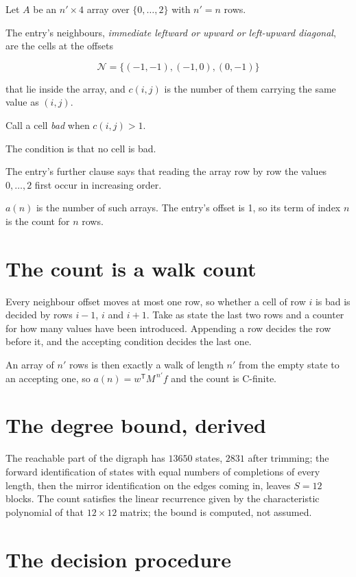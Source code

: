 \documentclass[11pt]{article}
\theoremstyle{definition}
\begin{document}
Let $A$ be an $n' \times 4$ array over $\{0,\dots,2\}$ with $n' = n$ rows.

The entry's neighbours, {\itshape immediate leftward or upward or left-upward diagonal}, are the cells at the offsets

\[\mathcal{N} = \{(-1,-1), (-1,0), (0,-1)\}\]

that lie inside the array, and $c(i,j)$ is the number of them carrying the same value as $(i,j)$.

Call a cell {\itshape bad} when $c(i,j) > 1$.

The condition is that no cell is bad.

The entry's further clause says that reading the array row by row the values $0,\dots,2$ first occur in increasing order.

$a(n)$ is the number of such arrays. The entry's offset is 1, so its term of index $n$ is the count for $n$ rows.

\section{The count is a walk count}

Every neighbour offset moves at most one row, so whether a cell of row $i$ is bad is decided by rows $i-1$, $i$ and $i+1$. Take as state the last two rows and a counter for how many values have been introduced. Appending a row decides the row before it, and the accepting condition decides the last one.

An array of $n'$ rows is then exactly a walk of length $n'$ from the empty state to an accepting one, so $a(n) = w^{\mathsf T}M^{\,n'}f$ and the count is C-finite.

\section{The degree bound, derived}

The reachable part of the digraph has $13650$ states, $2831$ after trimming; the forward identification of states with equal numbers of completions of every length, then the mirror identification on the edges coming in, leaves $S = 12$ blocks. The count satisfies the linear recurrence given by the characteristic polynomial of that $12\times12$ matrix; the bound is computed, not assumed.

\section{The decision procedure}
\end{document}
